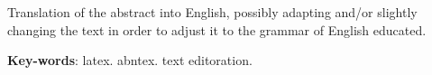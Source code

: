 %
%

\begin{resumo}[Abstract]
	Translation of the abstract into English, possibly adapting and/or slightly changing the text in order to adjust it to the grammar of English educated.

	\textbf{Key-words}: latex. abntex. text editoration.

\end{resumo}

